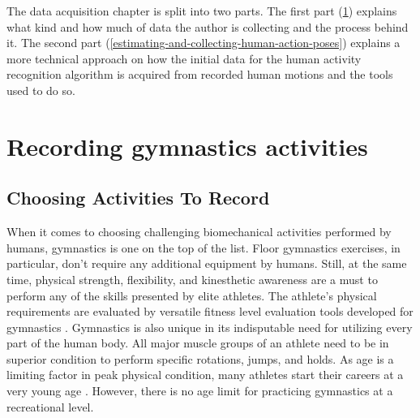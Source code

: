 The data acquisition chapter is split into two parts. The first part (\ref{recording-human-actions}) explains what kind and how much of data the author is collecting and the process behind it. The second part (\ref{estimating-and-collecting-human-action-poses}) explains a more technical approach on how the initial data for the human activity recognition algorithm is acquired from recorded human motions and the tools used to do so.

\section{Recording gymnastics activities}
\label{recording-human-actions}

\subsection{Choosing Activities To Record}

When it comes to choosing challenging biomechanical activities performed by humans, gymnastics is one on the top of the list. Floor gymnastics exercises, in particular, don't require any additional equipment by humans. Still, at the same time, physical strength, flexibility, and kinesthetic awareness are a must to perform any of the skills presented by elite athletes. The athlete's physical requirements are evaluated by versatile fitness level evaluation tools developed for gymnastics \cite{sleeper2012measuring}. Gymnastics is also unique in its indisputable need for utilizing every part of the human body. All major muscle groups of an athlete need to be in superior condition to perform specific rotations, jumps, and holds. As age is a limiting factor in peak physical condition, many athletes start their careers at a very young age \cite{artistic-vs-rhythmic-young-girls}. However, there is no age limit for practicing gymnastics at a recreational level.

